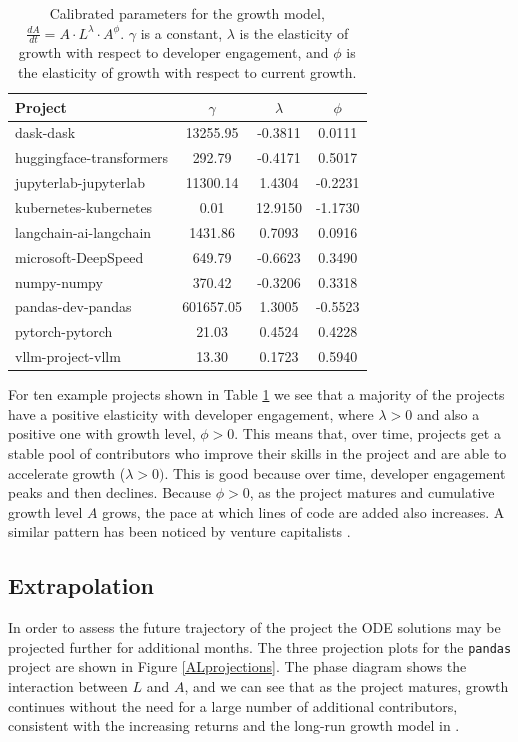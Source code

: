 \documentclass[conference]{IEEEtran}
\begin{document}
\begin{table} 
\centering
\caption{\label{tab:innov_params} \small Calibrated parameters for the growth model, $\frac{dA}{dt} = A \cdot L^{\lambda} \cdot A^{\phi}$. $\gamma$ is a constant, $\lambda$ is the elasticity of growth with respect to developer engagement, and $\phi$ is the elasticity of growth with respect to current growth. }
\begin{tabular}{lccc}
\toprule
Project & $\gamma$ & $\lambda$ & $\phi$ \\
\midrule
dask-dask & 13255.95 & -0.3811 & 0.0111 \\
huggingface-transformers & 292.79 & -0.4171 & 0.5017 \\
jupyterlab-jupyterlab & 11300.14 & 1.4304 & -0.2231 \\
kubernetes-kubernetes & 0.01 & 12.9150 & -1.1730 \\
langchain-ai-langchain & 1431.86 & 0.7093 & 0.0916 \\
microsoft-DeepSpeed & 649.79 & -0.6623 & 0.3490 \\
numpy-numpy & 370.42 & -0.3206 & 0.3318 \\
pandas-dev-pandas & 601657.05 & 1.3005 & -0.5523 \\
pytorch-pytorch & 21.03 & 0.4524 & 0.4228 \\
vllm-project-vllm & 13.30 & 0.1723 & 0.5940 \\
\bottomrule
\end{tabular}
\end{table}

For ten example projects shown in Table \ref{tab:innov_params} we see that a majority of the projects have a positive elasticity with developer engagement, where $\lambda>0$ and also a positive one with growth level, $\phi>0$. This means that, over time, projects get a stable pool of contributors who improve their skills in the project and are able to accelerate growth ($\lambda>0)$. This is good because over time, developer engagement peaks and then declines. Because $\phi>0$, as the project matures and cumulative growth level $A$ grows, the pace at which lines of code are added also increases. A similar pattern has been noticed by venture capitalists \citep{droesch_measuring_2020}. 

\subsection{Extrapolation}

In order to assess the future trajectory of the project the ODE solutions may be projected further for additional months. The three projection plots for the {\tt pandas} project are shown in Figure \ref{ALprojections}. The phase diagram shows the interaction between $L$ and $A$, and we can see that as the project matures, growth continues without the need for a large number of additional contributors, consistent with the increasing returns and the long-run growth model in \cite{romer_increasing_1986}. 
\end{document}
